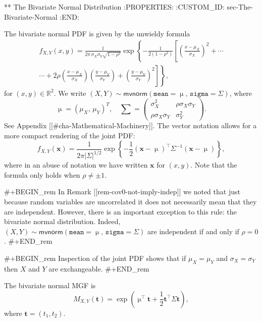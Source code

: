 ** The Bivariate Normal Distribution
:PROPERTIES:
:CUSTOM_ID: sec-The-Bivariate-Normal
:END:

The bivariate normal PDF is given by the unwieldy formula
\begin{multline}
f_{X,Y}(x,y)=\frac{1}{2\pi\,\sigma_{X}\sigma_{Y}\sqrt{1-\rho^{2}}}\exp\left\{ -\frac{1}{2(1-\rho^{2})}\left[\left(\frac{x-\mu_{X}}{\sigma_{X}}\right)^{2}+\cdots\right.\right.\\
\left.\left.\cdots+2\rho\left(\frac{x-\mu_{X}}{\sigma_{X}}\right)\left(\frac{y-\mu_{Y}}{\sigma_{Y}}\right)+\left(\frac{y-\mu_{Y}}{\sigma_{Y}}\right)^{2}\right]\right\} ,
\end{multline}
for \((x,y)\in\mathbb{R}^{2}\). We write \((X,Y)\sim\mathsf{mvnorm}(\mathtt{mean}=\upmu,\,\mathtt{sigma}=\Sigma)\), where
\begin{equation}
\upmu=(\mu_{X},\,\mu_{Y})^{T},\quad \sum=\left(
\begin{array}{cc}
\sigma_{X}^{2} & \rho\sigma_{X}\sigma_{Y}\\
\rho\sigma_{X}\sigma_{Y} & \sigma_{Y}^{2}
\end{array}
\right).
\end{equation}
See Appendix [[#cha-Mathematical-Machinery]]. The vector notation allows for a
more compact rendering of the joint PDF:
\begin{equation}
f_{X,Y}(\mathbf{x})=\frac{1}{2\pi\left|\Sigma\right|^{1/2}}\exp\left\{ -\frac{1}{2}\left(\mathbf{x}-\upmu\right)^{\top}\Sigma^{-1}\left(\mathbf{x}-\upmu\right)\right\} ,
\end{equation}
where in an abuse of notation we have written \(\mathbf{x}\) for
\((x,y)\). Note that the formula only holds when \(\rho\neq\pm1\).

#+BEGIN_rem
In Remark [[rem-cov0-not-imply-indep]] we noted that just because random
variables are uncorrelated it does not necessarily mean that they are
independent. However, there is an important exception to this rule:
the bivariate normal distribution. Indeed,
\((X,Y)\sim\mathsf{mvnorm}(\mathtt{mean}=\upmu,\,\mathtt{sigma}=\Sigma)\)
are independent if and only if \(\rho=0\).
#+END_rem

#+BEGIN_rem
Inspection of the joint PDF shows that if \(\mu_{X}=\mu_{Y}\) and
\(\sigma_{X}=\sigma_{Y}\) then \(X\) and \(Y\) are exchangeable.
#+END_rem

The bivariate normal MGF is
\begin{equation}
M_{X,Y}(\mathbf{t})=\exp\left(\upmu^{\top}\mathbf{t}+\frac{1}{2}\mathbf{t}^{\top}\Sigma\mathbf{t}\right),
\end{equation}
where \(\mathbf{t}=(t_{1},t_{2})\).

